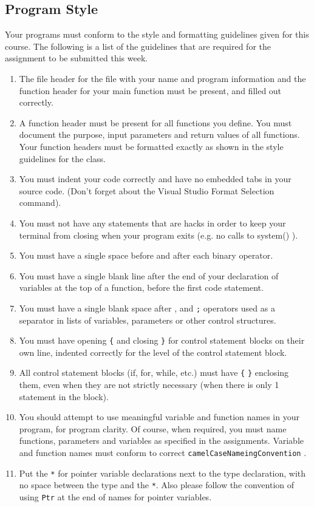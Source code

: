 \documentclass[11pt]{article}
\begin{document}
\subsection*{Program Style}
\label{sec-5-2}


Your programs must conform to the style and formatting guidelines
given for this course.  The following is a list of the guidelines that
are required for the assignment to be submitted this week.

\begin{enumerate}
\item The file header for the file with your name and program information
  and the function header for your main function must be present, and
  filled out correctly.
\item A function header must be present for all functions you define.
   You must document the purpose, input parameters and return values
   of all functions.  Your function headers must be formatted exactly
   as shown in the style guidelines for the class.
\item You must indent your code correctly and have no embedded tabs in
  your source code. (Don't forget about the Visual Studio Format
  Selection command).
\item You must not have any statements that are hacks in order to keep
   your terminal from closing when your program exits (e.g. no calls
   to system() ).
\item You must have a single space before and after each binary operator.
\item You must have a single blank line after the end of your declaration
  of variables at the top of a function, before the first code
  statement.
\item You must have a single blank space after , and \verb~;~ operators used as a
  separator in lists of variables, parameters or other control
  structures.
\item You must have opening \verb~{~ and closing \verb~}~ for control statement blocks
  on their own line, indented correctly for the level of the control
  statement block.
\item All control statement blocks (if, for, while, etc.) must have \verb~{~
   \verb~}~ enclosing them, even when they are not strictly necessary
   (when there is only 1 statement in the block).
\item You should attempt to use meaningful variable and function names in
   your program, for program clarity.  Of course, when required, you
   must name functions, parameters and variables as specified in the
   assignments.  Variable and function names must conform to correct
   \verb~camelCaseNameingConvention~ .
\item Put the \verb~*~ for pointer variable declarations next to the
   type declaration, with no space between the type and the \verb~*~.
   Also please follow the convention of using \verb~Ptr~ at the end of
   names for pointer variables.
\end{enumerate}
\end{document}
